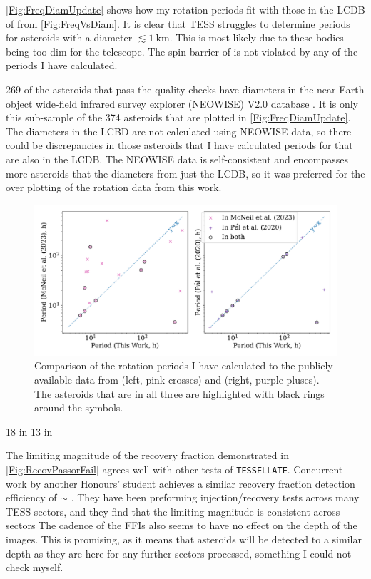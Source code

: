 \documentclass{UCreport}
\begin{document}
\autoref{Fig:FreqDiamUpdate} shows how my rotation periods fit with those in the LCDB of \cite{Warner2009} from \autoref{Fig:FreqVsDiam}.
It is clear that TESS struggles to determine periods for asteroids with a diameter $\lesssim \qty{1}{\kilo \metre}$. 
This is most likely due to these bodies being too dim for the telescope.  
The spin barrier of \citet{Pravec2000} is not violated by any of the periods I have calculated.

269 of the asteroids that pass the quality checks have diameters in the near-Earth object wide-field infrared survey explorer (NEOWISE) V2.0 database \citep{Masiero2011, NEOWISE2019}.
It is only this sub-sample of the 374 asteroids that are plotted in \autoref{Fig:FreqDiamUpdate}.
The diameters in the LCBD are not calculated using NEOWISE data, so there could be discrepancies in those asteroids that I have calculated periods for that are also in the LCDB. 
The NEOWISE data is self-consistent and encompasses more asteroids that the diameters from just the LCDB, so it was preferred for the over plotting of the rotation data from this work.



\begin{figure}
  \centering
  \includegraphics[width=\textwidth]{./Figures/M23andP20Comp.pdf}
  \caption[Comparison to periods from other work]{Comparison of the rotation periods I have calculated to the publicly available data from \citet{McNeill2023} (left, pink crosses) and \citet{Pal2020} (right, purple pluses). The asteroids that are in all three are highlighted with black rings around the symbols.}
\end{figure}

18 in \citet{McNeill2023}
13 in \citet{Pal2020}



The limiting magnitude of the recovery fraction demonstrated in \autoref{Fig:RecovPassorFail} agrees well with other tests of \texttt{TESSELLATE}.
Concurrent work by another Honours' student \citep{MontillaHons} achieves a similar recovery fraction detection efficiency of $\sim$ \unit{\mag}.
They have been preforming injection/recovery tests across many TESS sectors, and they find that the limiting magnitude is consistent across sectors
The cadence of the FFIs also seems to have no effect on the depth of the images.
This is promising, as it means that asteroids will be detected to a similar depth as they are here for any further sectors processed, something I could not check myself.
\end{document}

